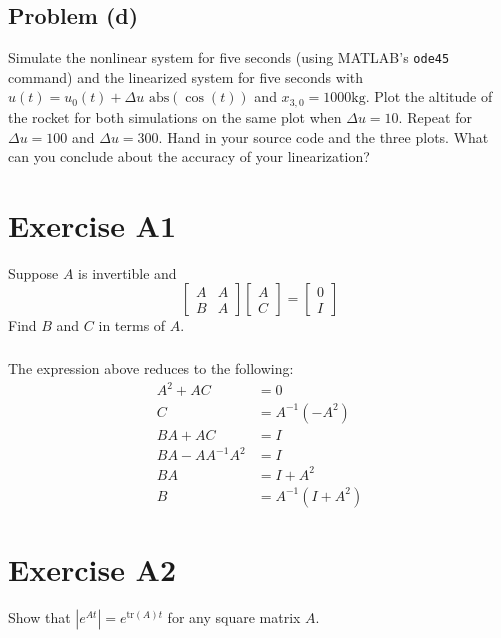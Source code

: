\documentclass[11pt]{article}
\begin{document}
\subsection*{Problem (d)}
Simulate the nonlinear system for five seconds (using MATLAB's \texttt{ode45} command) and the linearized system for five seconds with $u(t)=u_0(t)+\Delta u\text{ abs}(\cos(t))$ and $x_{3,0}=1000\text{kg}$. Plot the altitude of the rocket for both simulations on the same plot when $\Delta u=10$. Repeat for $\Delta u=100$ and $\Delta u=300$. Hand in your source code and the three plots. What can you conclude about the accuracy of your linearization?

\section*{Exercise A1}
Suppose $A$ is invertible and 
\begin{equation*}
	\begin{bmatrix} A & A \\ B & A \end{bmatrix} \begin{bmatrix} A \\ C \end{bmatrix} = \begin{bmatrix} 0 \\ I \end{bmatrix}
\end{equation*}
Find $B$ and $C$ in terms of $A$.

\subparagraph*{}
The expression above reduces to the following:
\begin{align*}
	A^2 + AC &= 0 \\
	C &= A^{-1}(-A^2) \\
	BA + AC &= I \\
	BA - AA^{-1}A^2 &= I \\
	BA &= I + A^2 \\
	B &= A^{-1}(I+A^2)
\end{align*}

\section*{Exercise A2}
Show that $|e^{At}|=e^{\text{tr}(A)t}$ for any square matrix $A$.
\end{document}
